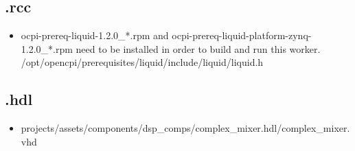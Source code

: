 \subsection*{\comp.rcc}
\begin{itemize}
   \item ocpi-prereq-liquid-1.2.0\_*.rpm and 	ocpi-prereq-liquid-platform-zynq-1.2.0\_*.rpm need to be installed in order to build and run this worker.
   \subitem /opt/opencpi/prerequisites/liquid/include/liquid/liquid.h
\end{itemize}
\subsection*{\comp.hdl}
\begin{itemize}
	\item projects/assets/components/dsp\_comps/complex\_mixer.hdl/complex\_mixer.vhd
        
\end{itemize}

